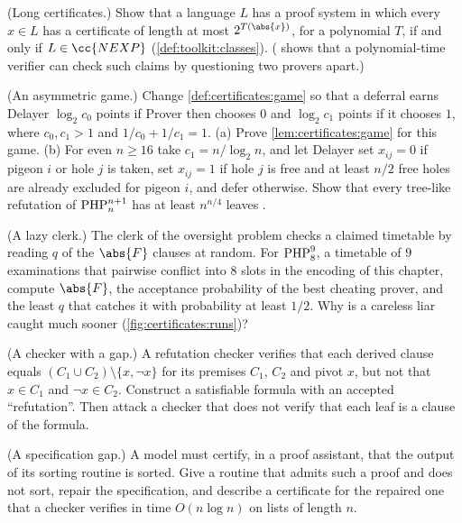 \begin{refsection}
\begin{exercises}
\item \variation (Long certificates.) Show that a language $L$ has a proof system in which every $x\in L$ has a certificate of length at most $2^{T(\abs{x})}$, for a polynomial $T$, if and only if $L\in\cc{NEXP}$ (\cref{def:toolkit:classes}). ( shows that a polynomial-time verifier can check such claims by questioning two provers apart.) \label{ex:certificates:nexp}

\item \variation\harder (An asymmetric game.) Change \cref{def:certificates:game} so that a deferral earns Delayer $\log_2c_0$ points if Prover then chooses $0$ and $\log_2c_1$ points if it chooses $1$, where $c_0,c_1>1$ and $1/c_0+1/c_1=1$. (a) Prove \cref{lem:certificates:game} for this game. (b) For even $n\ge16$ take $c_1=n/\log_2n$, and let Delayer set $x_{ij}=0$ if pigeon $i$ or hole $j$ is taken, set $x_{ij}=1$ if hole $j$ is free and at least $n/2$ free holes are already excluded for pigeon $i$, and defer otherwise. Show that every tree-like refutation of $\mathrm{PHP}^{n+1}_{n}$ has at least $n^{n/4}$ leaves \parencite{BeyersdorffGalesiLauria2010}. \label{ex:certificates:asymmetric}

\item \attack (A lazy clerk.) The clerk of the oversight problem checks a claimed timetable by reading $q$ of the $\abs{F}$ clauses at random. For $\mathrm{PHP}^{9}_{8}$, a timetable of $9$ examinations that pairwise conflict into $8$ slots in the encoding of this chapter, compute $\abs{F}$, the acceptance probability of the best cheating prover, and the least $q$ that catches it with probability at least $1/2$. Why is a careless liar caught much sooner (\cref{fig:certificates:runs})?\label{ex:certificates:lazy}

\item \attack (A checker with a gap.) A refutation checker verifies that each derived clause equals $(C_1\cup C_2)\setminus\{x,\neg x\}$ for its premises $C_1$, $C_2$ and pivot $x$, but not that $x\in C_1$ and $\neg x\in C_2$. Construct a satisfiable formula with an accepted ``refutation''. Then attack a checker that does not verify that each leaf is a clause of the formula.\label{ex:certificates:gap}

\item \attack (A specification gap.) A model must certify, in a proof assistant, that the output of its sorting routine is sorted. Give a routine that admits such a proof and does not sort, repair the specification, and describe a certificate for the repaired one that a checker verifies in time $O(n\log n)$ on lists of length $n$.\label{ex:certificates:spec}


\end{exercises}
\end{refsection}
